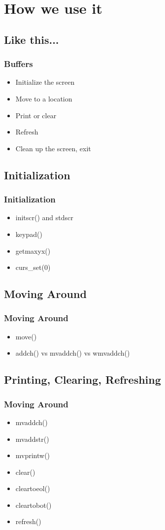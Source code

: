 \documentclass{beamer}
\begin{document}
\section{How we use it}
\subsection{Like this...}
\frame
{
    \frametitle{Buffers}

    \begin{itemize}
        \item Initialize the screen
        \item Move to a location 
        \item Print or clear
        \item Refresh
        \item Clean up the screen, exit
    \end{itemize}
}

\subsection{Initialization}
\frame
{
    \frametitle{Initialization}

    \begin{itemize}
        \item initscr() and stdscr
        \item keypad()
        \item getmaxyx()
        \item curs\_set(0)
    \end{itemize}
}

\subsection{Moving Around}
\frame
{
    \frametitle{Moving Around}

    \begin{itemize}
        \item move()
        \item addch() vs mvaddch() vs wmvaddch()
    \end{itemize}
}

\subsection{Printing, Clearing, Refreshing}
\frame
{
    \frametitle{Moving Around}

    \begin{itemize}
        \item mvaddch() 
        \item mvaddstr()
        \item mvprintw()
        \item clear()
        \item cleartoeol()
        \item cleartobot()
        \item refresh()
    \end{itemize}
}
\end{document}
